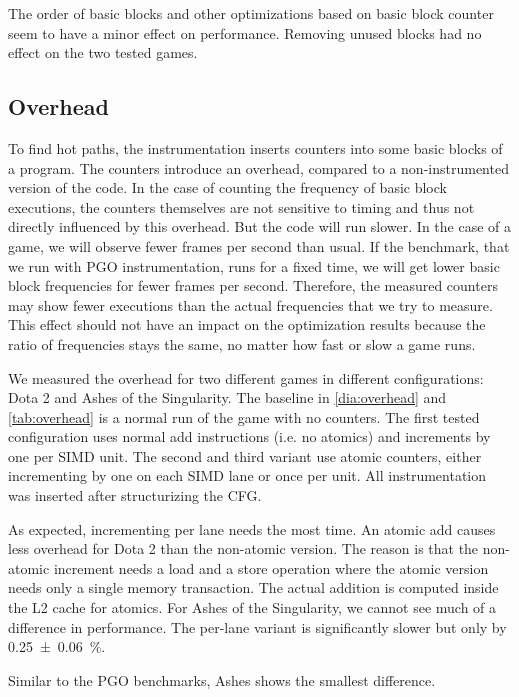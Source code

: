The order of basic blocks and other optimizations based on basic block counter seem to have a minor effect on performance.
Removing unused blocks had no effect on the two tested games.

\subsection{Overhead}
\label{sub:overhead}
To find hot paths, the instrumentation inserts counters into some basic blocks of a program. The counters introduce an overhead, compared to a non-instrumented version of the code.
In the case of counting the frequency of basic block executions, the counters themselves are not sensitive to timing and thus not directly influenced by this overhead.
But the code will run slower. In the case of a game, we will observe fewer frames per second than usual.
If the benchmark, that we run with PGO instrumentation, runs for a fixed time, we will get lower basic block frequencies for fewer frames per second.
Therefore, the measured counters may show fewer executions than the actual frequencies that we try to measure.
This effect should not have an impact on the optimization results because the ratio of frequencies stays the same, no matter how fast or slow a game runs.

We measured the overhead for two different games in different configurations: Dota 2 and Ashes of the Singularity. The baseline in \cref{dia:overhead} and \cref{tab:overhead} is a normal run of the game with no counters.
The first tested configuration uses normal add instructions (i.e. no atomics) and increments by one per SIMD unit.
The second and third variant use atomic counters, either incrementing by one on each SIMD lane or once per unit.
All instrumentation was inserted after structurizing the CFG.

As expected, incrementing per lane needs the most time. An atomic add causes less overhead for Dota 2 than the non-atomic version.
The reason is that the non-atomic increment needs a load and a store operation where the atomic version needs only a single memory transaction. The actual addition is computed inside the L2 cache for atomics.
For Ashes of the Singularity, we cannot see much of a difference in performance. The per-lane variant is significantly slower but only by \SI{0.25 \pm 0.06}{\percent}.



Similar to the PGO benchmarks, Ashes shows the smallest difference.

